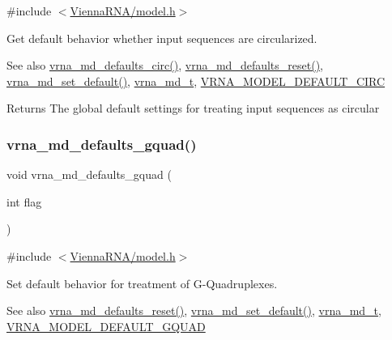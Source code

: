 {\ttfamily \#include $<$\hyperlink{model_8h}{Vienna\+R\+N\+A/model.\+h}$>$}



Get default behavior whether input sequences are circularized. 

\begin{DoxySeeAlso}{See also}
\hyperlink{group__model__details_ga4e1deb3e91a8a99e5c6dd905a5eb0186}{vrna\+\_\+md\+\_\+defaults\+\_\+circ()}, \hyperlink{group__model__details_ga70834424cf804d149937de89f80ceb45}{vrna\+\_\+md\+\_\+defaults\+\_\+reset()}, \hyperlink{group__model__details_ga8ac6ff84936282436f822644bf841f66}{vrna\+\_\+md\+\_\+set\+\_\+default()}, \hyperlink{group__model__details_ga1f8a10e12a0a1915f2a4eff0b28ea17c}{vrna\+\_\+md\+\_\+t}, \hyperlink{group__model__details_ga22059033db7bcd875c51fec32425490a}{V\+R\+N\+A\+\_\+\+M\+O\+D\+E\+L\+\_\+\+D\+E\+F\+A\+U\+L\+T\+\_\+\+C\+I\+RC} 
\end{DoxySeeAlso}
\begin{DoxyReturn}{Returns}
The global default settings for treating input sequences as circular 
\end{DoxyReturn}
\mbox{\label{group__model__details_ga0685ca2aeb39af76f2421fc308163dce}} 
\subsubsection{\texorpdfstring{vrna\+\_\+md\+\_\+defaults\+\_\+gquad()}{vrna\_md\_defaults\_gquad()}}
{\footnotesize\ttfamily void vrna\+\_\+md\+\_\+defaults\+\_\+gquad (\begin{DoxyParamCaption}\item[{int}]{flag }\end{DoxyParamCaption})}



{\ttfamily \#include $<$\hyperlink{model_8h}{Vienna\+R\+N\+A/model.\+h}$>$}



Set default behavior for treatment of G-\/\+Quadruplexes. 

\begin{DoxySeeAlso}{See also}
\hyperlink{group__model__details_ga70834424cf804d149937de89f80ceb45}{vrna\+\_\+md\+\_\+defaults\+\_\+reset()}, \hyperlink{group__model__details_ga8ac6ff84936282436f822644bf841f66}{vrna\+\_\+md\+\_\+set\+\_\+default()}, \hyperlink{group__model__details_ga1f8a10e12a0a1915f2a4eff0b28ea17c}{vrna\+\_\+md\+\_\+t}, \hyperlink{group__model__details_ga793ed812e86f43799b14b2deee917f23}{V\+R\+N\+A\+\_\+\+M\+O\+D\+E\+L\+\_\+\+D\+E\+F\+A\+U\+L\+T\+\_\+\+G\+Q\+U\+AD} 
\end{DoxySeeAlso}

